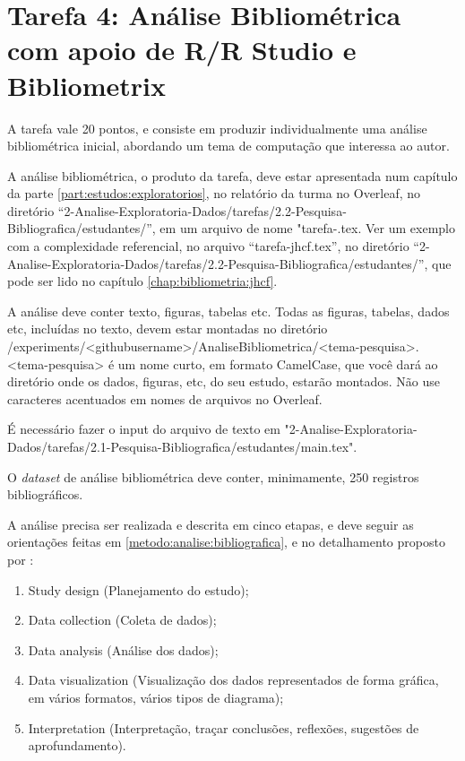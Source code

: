 \section{Tarefa 4: Análise Bibliométrica com apoio de R/R Studio e Bibliometrix}

A tarefa vale 20 pontos, e consiste em produzir individualmente uma análise bibliométrica inicial, abordando um tema de computação que  interessa ao autor. 

A análise bibliométrica, o produto da tarefa, deve estar apresentada num capítulo da parte \ref{part:estudos:exploratorios}, no relatório da turma no Overleaf, no diretório ``2-Analise-Exploratoria-Dados/tarefas/2.2-Pesquisa-Bibliografica/estudantes/'', em um arquivo de nome "tarefa-\githubusername.tex. Ver um exemplo com a complexidade referencial, no arquivo ``tarefa-jhcf.tex'', no diretório ``2-Analise-Exploratoria-Dados/tarefas/2.2-Pesquisa-Bibliografica/estudantes/'', que pode ser lido no capítulo \ref{chap:bibliometria:jhcf}. 

A análise deve conter texto, figuras, tabelas  etc. Todas as figuras, tabelas, dados etc, incluídas no texto, devem estar montadas no diretório /experiments/<githubusername>/AnaliseBibliometrica/<tema-pesquisa>. 
<tema-pesquisa> é um nome curto, em formato CamelCase, que você dará ao diretório onde os dados, figuras, etc, do seu estudo, estarão montados. Não use caracteres acentuados em nomes de arquivos no Overleaf.

É necessário fazer o input do arquivo de texto em "2-Analise-Exploratoria-Dados/tarefas/2.1-Pesquisa-Bibliografica/estudantes/main.tex".

O \textit{dataset} de análise bibliométrica deve conter, minimamente, 250 registros bibliográficos.

A análise precisa ser realizada e descrita em cinco etapas, e deve seguir as orientações feitas em \ref{metodo:analise:bibliografica}, e no detalhamento proposto por \citet{aria_bibliometrix_2017}:
\begin{enumerate}
    \item Study design (Planejamento do estudo);

    \item  Data collection (Coleta de dados);

    \item Data analysis (Análise dos dados);

    \item Data visualization (Visualização dos dados representados de forma gráfica, em vários formatos, vários tipos de diagrama);

    \item  Interpretation (Interpretação, traçar conclusões, reflexões, sugestões de aprofundamento).
\end{enumerate}

